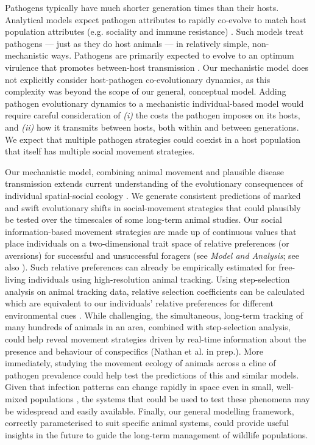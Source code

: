 Pathogens typically have much shorter generation times than their hosts.
Analytical models expect pathogen attributes to rapidly co-evolve to match host population attributes (e.g. sociality and immune resistance) \citep[][]{bonds2005,prado2009,ashby2021}.
Such models treat pathogens --- just as they do host animals --- in relatively simple, non-mechanistic ways.
Pathogens are primarily expected to evolve to an optimum virulence that promotes between-host transmission \citep{bonds2005}.
Our mechanistic model does not explicitly consider host-pathogen co-evolutionary dynamics, as this complexity was beyond the scope of our general, conceptual model.
Adding pathogen evolutionary dynamics to a mechanistic individual-based model would require careful consideration of \textit{(i)} the costs the pathogen imposes on its hosts, and \textit{(ii)} how it transmits between hosts, both within and between generations.
We expect that multiple pathogen strategies could coexist in a host population that itself has multiple social movement strategies.

Our mechanistic model, combining animal movement and plausible disease transmission extends current understanding of the evolutionary consequences of individual spatial-social ecology \citep{webber2018,albery2021}.
We generate consistent predictions of marked and swift evolutionary shifts in social-movement strategies that could plausibly be tested over the timescales of some long-term animal studies.
Our social information-based movement strategies are made up of continuous values that place individuals on a two-dimensional trait space of relative preferences (or aversions) for successful and unsuccessful foragers (see \textit{Model and Analysis}; see also \citealt{gupte2021a}).
Such relative preferences can already be empirically estimated for free-living individuals using high-resolution animal tracking.
Using step-selection analysis on animal tracking data, relative selection coefficients can be calculated which are equivalent to our individuals' relative preferences for different environmental cues \citep{avgar2016,gupte2021a}.
While challenging, the simultaneous, long-term tracking of many hundreds of animals in an area, combined with step-selection analysis, could help reveal movement strategies driven by real-time information about the presence and behaviour of conspecifics (Nathan et al. in prep.).
More immediately, studying the movement ecology of animals across a cline of pathogen prevalence could help test the predictions of this and similar models. 
Given that infection patterns can change rapidly in space even in small, well-mixed populations \citep{albery2022}, the systems that could be used to test these phenomena may be widespread and easily available.
Finally, our general modelling framework, correctly parameterised to suit specific animal systems, could provide useful insights in the future to guide the long-term management of wildlife populations.

